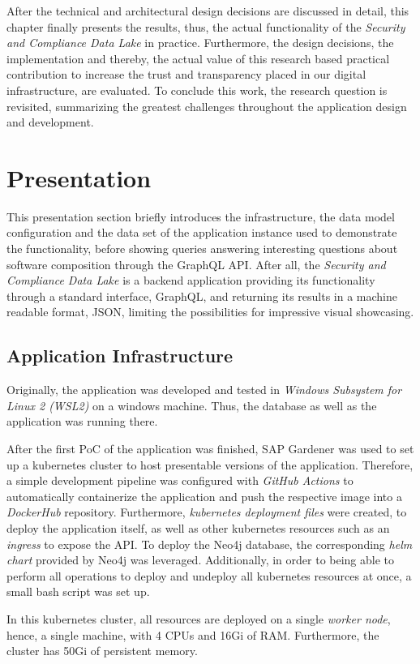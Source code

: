 
After the technical and architectural design decisions are discussed in detail, this chapter finally presents the results, thus, the actual functionality of the \emph{Security and Compliance Data Lake} in practice. Furthermore, the design decisions, the implementation and thereby, the actual value of this research based practical contribution to increase the trust and transparency placed in our digital infrastructure, are evaluated. To conclude this work, the research question is revisited, summarizing the greatest challenges throughout the application design and development. 

\section{Presentation} \label{sec:Presentation}
This presentation section briefly introduces the infrastructure, the data model configuration and the data set of the application instance used to demonstrate the functionality, before showing queries answering interesting questions about software composition through the GraphQL API. After all, the \emph{Security and Compliance Data Lake} is a backend application providing its functionality through a standard interface, GraphQL, and returning its results in a machine readable format, JSON, limiting the possibilities for impressive visual showcasing.   

\subsection{Application Infrastructure}
Originally, the application was developed and tested in \emph{Windows Subsystem for Linux 2 (WSL2)} on a windows machine. Thus, the database as well as the application was running there.\par
After the first PoC of the application was finished, SAP Gardener was used to set up a kubernetes cluster to host presentable versions of the application. Therefore, a simple development pipeline was configured with \emph{GitHub Actions} to automatically containerize the application and push the respective image into a \emph{DockerHub} repository. Furthermore, \emph{kubernetes deployment files} were created, to deploy the application itself, as well as other kubernetes resources such as an \emph{ingress} to expose the API. To deploy the Neo4j database, the corresponding \emph{helm chart} provided by Neo4j was leveraged. Additionally, in order to being able to perform all operations to deploy and undeploy all kubernetes resources at once, a small bash script was set up.\par
In this kubernetes cluster, all resources are deployed on a single \emph{worker node}, hence, a single machine, with 4 CPUs and 16Gi of RAM. Furthermore, the cluster has 50Gi of persistent memory.

